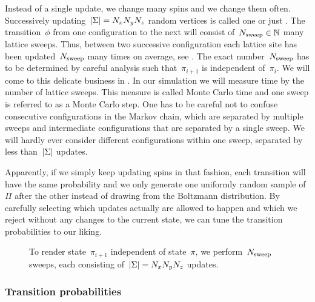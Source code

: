 Instead of a single update, we change many spins and we change them often.
Successively updating~$\abs{\Sigma} = N_x N_y N_z$ random vertices is called one
 or just . The transition~$\phi$ from one
configuration to the next will consist of~$N_{\mathrm{sweep}} \in \mathbb{N}$ many lattice sweeps.
Thus, between two successive configuration each lattice site has been
updated~$N_{\mathrm{sweep}}$ many times on average, see . The exact
number~$N_{\mathrm{sweep}}$ has to be determined by careful analysis such that~$\pi_{i+1}$
is independent of~$\pi_i$. We will come to this delicate business in
. In our simulation we will measure time by the number of
lattice sweeps. This measure is called Monte Carlo time and one sweep is
referred to as a Monte Carlo step. One has to be careful not to confuse
consecutive configurations in the Markov chain, which are separated by multiple
sweeps and intermediate configurations that are separated by a single sweep. We
will hardly ever consider different configurations within one sweep, \ie{}
separated by less than~$\abs{\Sigma}$ updates.

Apparently, if we simply keep updating spins in that fashion, each transition
will have the same probability and we only generate one uniformly random sample
of~$\Pi$ after the other instead of drawing from the Boltzmann distribution. By
carefully selecting which updates actually are allowed to happen and which we
reject without any changes to the current state, we can tune the transition
probabilities to our liking.

\begin{figure}
  \centering
  \caption{To render state~$\pi_{i+1}$ independent of state~$\pi$, we
  perform~$N_{\mathrm{sweep}}$ sweeps, each consisting of~$\abs{\Sigma} = N_x N_y N_z$
  updates.}
\label{fig:update}
\end{figure}

\subsubsection{Transition probabilities}

